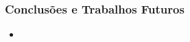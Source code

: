 \begin{frame}
	\frametitle{Conclusões e Trabalhos Futuros}
	\begin{itemize}
		\item 
	\end{itemize}
\end{frame}